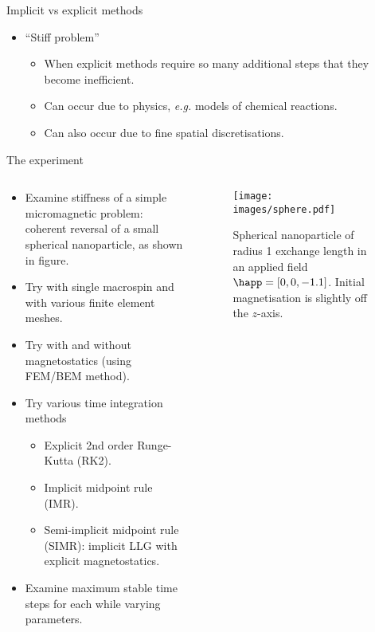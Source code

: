 \documentclass[final]{beamer} %
\newlength{\wideitemsep}
\let\olditem\item
\renewcommand{\item}{\setlength{\itemsep}{\wideitemsep}\olditem}
\let\cite=\supercite
\newcommand{\eg}{\textit{e.g.} }
\begin{document}
\begin{frame}
\begin{columns}
\begin{column}{0.47\textwidth}
{\begin{block}{\boxnumber Implicit vs explicit methods}
\begin{itemize}
          \item ``Stiff problem''
            \begin{itemize}
            \item When explicit methods require so many additional steps that they become inefficient. 
            \item Can occur due to physics, \eg models of chemical reactions.
            \item Can also occur due to fine spatial discretisations.
            \end{itemize}
          \end{itemize}
        \end{block}

        \vfill

        \begin{block}{\boxnumber The experiment} 
          \begin{columns}
            \begin{column}{0.6\textwidth}
              \begin{itemize}
              \item Examine stiffness of a simple micromagnetic problem: coherent reversal of a small spherical nanoparticle\cite{Mallinson2000}, as shown in figure.
              \item Try with single macrospin and with various finite element meshes.
              \item Try with and without magnetostatics (using FEM/BEM method\cite{Knittel2011}).
              \item Try various time integration methods
                \begin{itemize}
                \item Explicit 2nd order Runge-Kutta (RK2).
                \item Implicit midpoint rule (IMR)\cite{DAquino2005}.
                \item Semi-implicit midpoint rule (SIMR): implicit LLG with explicit magnetostatics\cite{Shepherd2014}.
                \end{itemize}
              \item Examine maximum stable time steps for each while varying parameters.
              \end{itemize}
            \end{column}

            \begin{column}{0.4\textwidth}
              \begin{figure}[h]
                \centering
                \texttt{[image: images/sphere.pdf]}
                \caption{Spherical nanoparticle of radius 1 exchange length in an applied field $\happ = [0, 0, -1.1]$. Initial magnetisation is slightly off the $z$-axis.}
                \label{fig:sphere}
              \end{figure} 
            \end{column}


\end{columns}
\end{block}}
\end{column}
\end{columns}
\end{frame}
\end{document}
